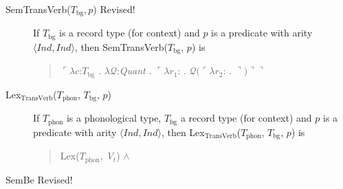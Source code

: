 \begin{description}
        
      \item[\textnormal{SemTransVerb($T_{\mathrm{bg}}, p$)} Revised!] \mbox{}

        If $T_{\text{bg}}$ is a record type (for context) and $p$ is a
        predicate with arity $\langle\textit{Ind},\textit{Ind}\rangle$, then SemTransVerb($T_{\mathrm{bg}}$, $p$) is
        \begin{quote}
          $\ulcorner\lambda c$:$T_{\mathrm{bg}}$ . $\lambda
          \mathcal{Q}$:\textit{Quant} . $\ulcorner\lambda
          r_1$: . $\mathcal{Q}(\ulcorner\lambda r_2$:
          . $\urcorner)\urcorner\urcorner$
        \end{quote}
        
\item[\textnormal{Lex$_{\mathrm{TransVerb}}$($T_{\mathrm{phon}}$,
          $T_{\mathrm{bg}}$, $p$)}] \mbox{}

        If $T_{\mathrm{phon}}$ is a phonological type,
        $T_{\mathrm{bg}}$ a record type (for context) and $p$ is a
        predicate with arity $\langle\textit{Ind},\textit{Ind}\rangle$, then Lex$_{\mathrm{TransVerb}}$($T_{\mathrm{phon}}$,
        $T_{\mathrm{bg}}$, $p$) is
        \begin{quote}
          Lex($T_{\mathrm{phon}}$, \textit{V$_t$}) \d{$\wedge$}
        \end{quote}

        

        
      \item[\textnormal{SemBe} Revised!] \mbox{}


        \begin{description}
          

\end{description}
\end{description}
